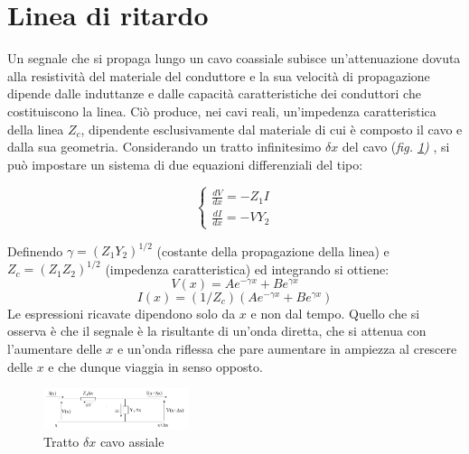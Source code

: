 \documentclass[journal]{IEEEtran}
\begin{document}
\section{Linea di ritardo} %

Un segnale che si propaga lungo un cavo coassiale subisce un'attenuazione dovuta alla resistività del materiale del conduttore e la sua velocità di propagazione dipende dalle induttanze e dalle capacità caratteristiche dei conduttori che costituiscono la linea. Ciò produce, nei cavi reali, un'impedenza caratteristica della linea $Z_c$, dipendente esclusivamente dal materiale di cui è composto il cavo e dalla sua geometria.
Considerando un tratto infinitesimo $\delta x$ del cavo (\textit{fig. \ref{fig:coassiale}) }, si può impostare un sistema di due equazioni differenziali del tipo:


\begin{equation}
    \begin{cases}
  \frac{dV}{dx} = -Z_1 I \\
  \frac{dI}{dx} = -V Y_2 
\end{cases} 
\end{equation}

Definendo $\gamma = (Z_1 Y_2)^{1/2}$ (costante della propagazione della linea) e $Z_c = (Z_1 Z_2)^{1/2}$ (impedenza caratteristica) ed integrando si ottiene:
 \begin{equation}
     V(x) = Ae^{-\gamma x} + Be^{\gamma x}
 \end{equation}
 \begin{equation}
     I(x) = (1/Z_c)(Ae^{-\gamma x} + Be^{\gamma x}) 
 \end{equation}
Le espressioni ricavate dipendono solo da $x$ e non dal tempo. 
Quello che si osserva è che il segnale è la risultante di un'onda diretta, che si attenua con l'aumentare delle $x$ e un'onda riflessa che pare aumentare in ampiezza al crescere delle $x$ e che dunque viaggia in senso opposto.

\begin{figure}[H]%
\begin {center}
\includegraphics[width=0.38\textwidth]{analysis/output/cavo coassiale.png}
\caption{Tratto $\delta x$ cavo assiale}
\label{fig:coassiale}
\end {center}
\end{figure}
\end{document}
